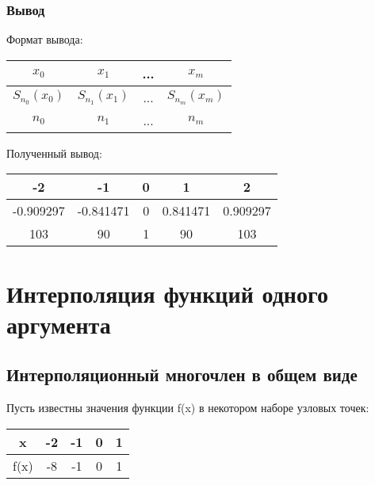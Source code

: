 \documentclass[bachelor, och, pract]{SCWorks}
\begin{document}
\subsubsection{Вывод}

Формат вывода:


\begin{table}[h]
    \centering
    \begin{tabular}{|c|c|c|c|}
         \hline$x_0$& $x_1$ & ... & $x_m$\\\hline
        $S_{n_0}(x_0)$ & $S_{n_1}(x_1)$ & ... & $S_{n_m}(x_m)$ \\\hline
        $n_0$ & $n_1$ & ... &$n_m$ \\\hline
    \end{tabular}
\end{table}


Полученный вывод:

\begin{table}[h]
    \centering
    \begin{tabular}{|c|c|c|c|c|}
         \hline-2 & -1 & 0 & 1 & 2\\\hline
          -0.909297 &  -0.841471 & 0 & 0.841471 & 0.909297 \\\hline
        103 & 90& 1 & 90 & 103 \\\hline
    \end{tabular}
\end{table}


\section{Интерполяция функций одного аргумента}

\subsection{Интерполяционный многочлен в общем виде}

Пусть известны значения функции f(x) в некотором наборе узловых точек:

\begin{table}[h]
    \centering
    \begin{tabular}{|c|c|c|c|c|}
         \hline x & -2 & -1 & 0 & 1\\\hline
          f(x) &  -8 &-1 & 0 & 1 \\\hline
    \end{tabular}
\end{table}
\end{document}
